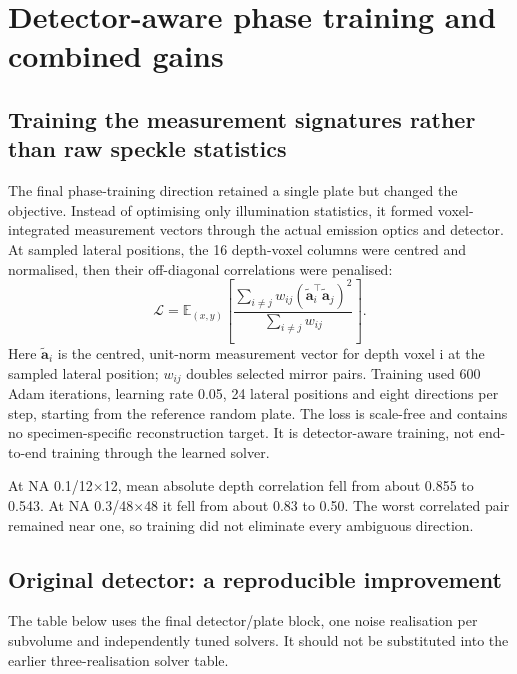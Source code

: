 \section{Detector-aware phase training and combined gains}

\subsection{Training the measurement signatures rather than raw speckle statistics}

The final phase-training direction retained a single plate but changed the objective. Instead of optimising only illumination statistics, it formed voxel-integrated measurement vectors through the actual emission optics and detector. At sampled lateral positions, the 16 depth-voxel columns were centred and normalised, then their off-diagonal correlations were penalised:
\[
\mathcal L=\mathbb E_{(x,y)}\left[
\frac{\sum_{i\ne j}w_{ij}
\left(\widetilde{\mathbf a}_i^\top\widetilde{\mathbf a}_j\right)^2}
{\sum_{i\ne j}w_{ij}}\right].
\]
Here \(\widetilde{\mathbf a}_i\) is the centred, unit-norm measurement vector for depth voxel i at the sampled lateral position; \(w_{ij}\) doubles selected mirror pairs. Training used 600 Adam iterations, learning rate 0.05, 24 lateral positions and eight directions per step, starting from the reference random plate. The loss is scale-free and contains no specimen-specific reconstruction target. It is detector-aware training, not end-to-end training through the learned solver.

At NA 0.1/12\ensuremath{\times}12, mean absolute depth correlation fell from about 0.855 to 0.543. At NA 0.3/48\ensuremath{\times}48 it fell from about 0.83 to 0.50. The worst correlated pair remained near one, so training did not eliminate every ambiguous direction.

\subsection{Original detector: a reproducible improvement}

The table below uses the final detector/plate block, one noise realisation per subvolume and independently tuned solvers. It should not be substituted into the earlier three-realisation solver table.

